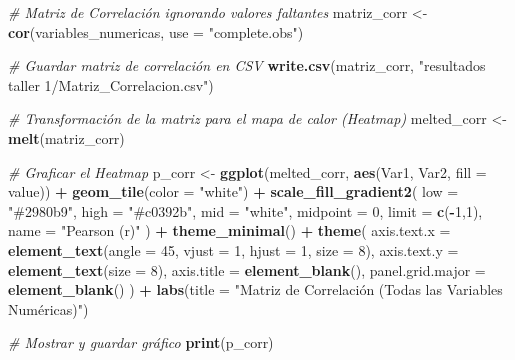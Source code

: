 \documentclass[
]{article}
\newenvironment{Shaded}{\begin{snugshade}}{\end{snugshade}}
\newcommand{\AttributeTok}[1]{\textcolor[rgb]{0.13,0.29,0.53}{#1}}
\newcommand{\CommentTok}[1]{\textcolor[rgb]{0.56,0.35,0.01}{\textit{#1}}}
\newcommand{\DecValTok}[1]{\textcolor[rgb]{0.00,0.00,0.81}{#1}}
\newcommand{\FunctionTok}[1]{\textcolor[rgb]{0.13,0.29,0.53}{\textbf{#1}}}
\newcommand{\NormalTok}[1]{#1}
\newcommand{\OtherTok}[1]{\textcolor[rgb]{0.56,0.35,0.01}{#1}}
\newcommand{\SpecialCharTok}[1]{\textcolor[rgb]{0.81,0.36,0.00}{\textbf{#1}}}
\newcommand{\StringTok}[1]{\textcolor[rgb]{0.31,0.60,0.02}{#1}}
\begin{document}
\begin{Shaded}
\begin{Highlighting}[]
\CommentTok{\# Matriz de Correlación ignorando valores faltantes}
\NormalTok{matriz\_corr }\OtherTok{\textless{}{-}} \FunctionTok{cor}\NormalTok{(variables\_numericas, }\AttributeTok{use =} \StringTok{"complete.obs"}\NormalTok{)}

\CommentTok{\# Guardar matriz de correlación en CSV}
\FunctionTok{write.csv}\NormalTok{(matriz\_corr, }\StringTok{"resultados taller 1/Matriz\_Correlacion.csv"}\NormalTok{)}

\CommentTok{\# Transformación de la matriz para el mapa de calor (Heatmap)}
\NormalTok{melted\_corr }\OtherTok{\textless{}{-}} \FunctionTok{melt}\NormalTok{(matriz\_corr)}

\CommentTok{\# Graficar el Heatmap}
\NormalTok{p\_corr }\OtherTok{\textless{}{-}} \FunctionTok{ggplot}\NormalTok{(melted\_corr, }\FunctionTok{aes}\NormalTok{(Var1, Var2, }\AttributeTok{fill =}\NormalTok{ value)) }\SpecialCharTok{+}
  \FunctionTok{geom\_tile}\NormalTok{(}\AttributeTok{color =} \StringTok{"white"}\NormalTok{) }\SpecialCharTok{+}
  \FunctionTok{scale\_fill\_gradient2}\NormalTok{(}
    \AttributeTok{low =} \StringTok{"\#2980b9"}\NormalTok{, }\AttributeTok{high =} \StringTok{"\#c0392b"}\NormalTok{, }\AttributeTok{mid =} \StringTok{"white"}\NormalTok{, }
    \AttributeTok{midpoint =} \DecValTok{0}\NormalTok{, }\AttributeTok{limit =} \FunctionTok{c}\NormalTok{(}\SpecialCharTok{{-}}\DecValTok{1}\NormalTok{,}\DecValTok{1}\NormalTok{), }\AttributeTok{name =} \StringTok{"Pearson (r)"}
\NormalTok{  ) }\SpecialCharTok{+}
  \FunctionTok{theme\_minimal}\NormalTok{() }\SpecialCharTok{+}
  \FunctionTok{theme}\NormalTok{(}
    \AttributeTok{axis.text.x =} \FunctionTok{element\_text}\NormalTok{(}\AttributeTok{angle =} \DecValTok{45}\NormalTok{, }\AttributeTok{vjust =} \DecValTok{1}\NormalTok{, }\AttributeTok{hjust =} \DecValTok{1}\NormalTok{, }\AttributeTok{size =} \DecValTok{8}\NormalTok{),}
    \AttributeTok{axis.text.y =} \FunctionTok{element\_text}\NormalTok{(}\AttributeTok{size =} \DecValTok{8}\NormalTok{),}
    \AttributeTok{axis.title =} \FunctionTok{element\_blank}\NormalTok{(),}
    \AttributeTok{panel.grid.major =} \FunctionTok{element\_blank}\NormalTok{()}
\NormalTok{  ) }\SpecialCharTok{+}
  \FunctionTok{labs}\NormalTok{(}\AttributeTok{title =} \StringTok{"Matriz de Correlación (Todas las Variables Numéricas)"}\NormalTok{)}

\CommentTok{\# Mostrar y guardar gráfico}
\FunctionTok{print}\NormalTok{(p\_corr)}
\end{Highlighting}
\end{Shaded}
\end{document}
